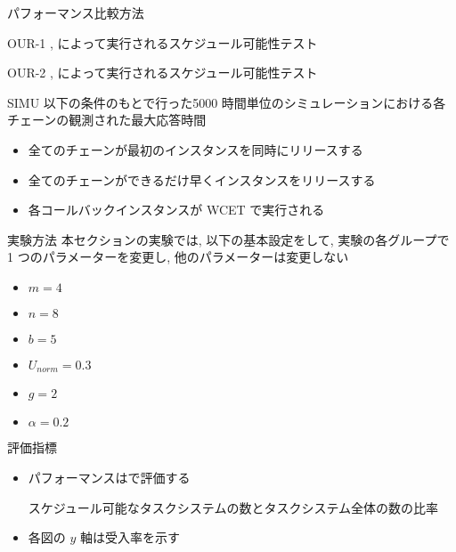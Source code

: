 \begin{frame}{パフォーマンス比較方法}
    \vspace{1mm}
    \begin{block}{OUR-1}
        ,  によって実行されるスケジュール可能性テスト
    \end{block}
    \begin{block}{OUR-2}
        ,  によって実行されるスケジュール可能性テスト
    \end{block}
    \begin{block}{SIMU}
        以下の条件のもとで行った5000 時間単位のシミュレーションにおける各チェーンの観測された最大応答時間
        \setlength{\linewidth}{0.98\columnwidth}
        \footnotesize
        \begin{itemize}
            \item 全てのチェーンが最初のインスタンスを同時にリリースする
            \item 全てのチェーンができるだけ早くインスタンスをリリースする
            \item 各コールバックインスタンスが WCET で実行される
        \end{itemize}
    \end{block}
\end{frame}

\begin{frame}{実験方法}
    本セクションの実験では, 以下の基本設定をして, 実験の各グループで 1 つのパラメーターを変更し, 他のパラメーターは変更しない
    \begin{itemize}
        \item $m=4$
        \item $n=8$
        \item $b=5$
        \item $U_{n o r m}=0.3$
        \item $g=2$
        \item $\alpha=0.2$
    \end{itemize}
\end{frame}

\begin{frame}{評価指標}
    \begin{itemize}
        \item パフォーマンスはで評価する
              \begin{definition}[受入率]
                  スケジュール可能なタスクシステムの数とタスクシステム全体の数の比率
              \end{definition}
              \vspace{5mm}
        \item 各図の $y$ 軸は受入率を示す
    \end{itemize}
\end{frame}

